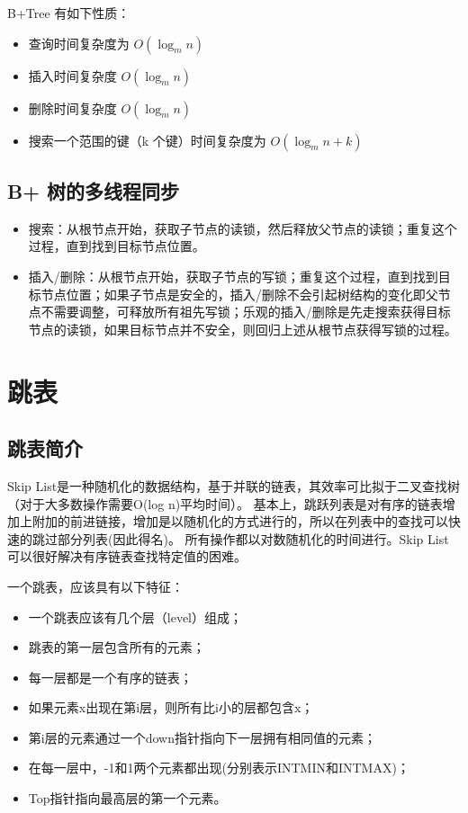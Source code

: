 B+Tree 有如下性质：
\begin{itemize}
\item 查询时间复杂度为 $O(\log _{m}n)$
\item 插入时间复杂度 $O(\log _{m}n)$
\item 删除时间复杂度 $O(\log _{m}n)$
\item 搜索一个范围的键（k 个键）时间复杂度为 ${\displaystyle O(\log _{m}n+k)}$
\end{itemize}

\subsection{B+ 树的多线程同步}

\begin{itemize}

\item 搜索：从根节点开始，获取子节点的读锁，然后释放父节点的读锁；重复这个过程，直到找到目标节点位置。
\item 插入/删除：从根节点开始，获取子节点的写锁；重复这个过程，直到找到目标节点位置；如果子节点是安全的，插入/删除不会引起树结构的变化即父节点不需要调整，可释放所有祖先写锁；乐观的插入/删除是先走搜索获得目标节点的读锁，如果目标节点并不安全，则回归上述从根节点获得写锁的过程。

\end{itemize}

\section{跳表}

\subsection{跳表简介}
Skip List是一种随机化的数据结构，基于并联的链表，其效率可比拟于二叉查找树（对于大多数操作需要O(log n)平均时间）。
基本上，跳跃列表是对有序的链表增加上附加的前进链接，增加是以随机化的方式进行的，所以在列表中的查找可以快速的跳过部分列表(因此得名)。
所有操作都以对数随机化的时间进行。Skip List可以很好解决有序链表查找特定值的困难。

一个跳表，应该具有以下特征：
\begin{itemize}
\item 一个跳表应该有几个层（level）组成；

\item 跳表的第一层包含所有的元素；

\item 每一层都是一个有序的链表；

\item 如果元素x出现在第i层，则所有比i小的层都包含x；

\item 第i层的元素通过一个down指针指向下一层拥有相同值的元素；

\item 在每一层中，-1和1两个元素都出现(分别表示INTMIN和INTMAX)；

\item Top指针指向最高层的第一个元素。
\end{itemize}

